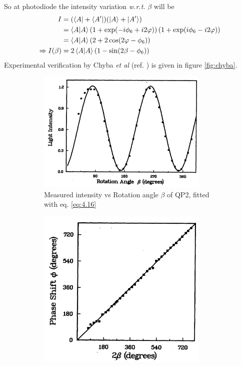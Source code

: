 \documentclass[11pt,a4paper]{article}
\numberwithin{equation}{section}
\begin{document}
So at photodiode the intensity variation \textit{w.r.t.} $\beta$ will be
\begin{align}
	I &= (\bra{A}+\bra{A'})(\ket{A}+\ket{A'}) \nonumber\\
	&= \braket{A}{A} \left(1+\exp(-i\phi_6+i2\varphi)\right)\left(1+\exp(i\phi_6-i2\varphi)\right)\nonumber\\
	&= \braket{A}{A}(2 + 2\cos(2\varphi - \phi_6))\nonumber\\
	\Rightarrow I(\beta)&= 2\braket{A}{A} \left(1- \sin(2\beta - \phi_6)\right) \label{eq:4.16}
\end{align}
Experimental verification by Chyba \textit{et al} (ref. \cite{chyba 88}) is given in figure \ref{fig:chyba}.
\begin{figure}[H]
	\begin{subfigure}[H]{0.53\textwidth}
		\centering
		\includegraphics[width=0.9\textwidth]{chyba 1.png}
		\caption{Measured intensity vs Rotation angle  $\beta$ of QP2, fitted with eq. \ref{eq:4.16} }
		\label{fig:chyba a}
	\end{subfigure}
	\hfil
	\begin{subfigure}[H]{0.41\textwidth}
		\centering
		\includegraphics[width=0.9\textwidth]{chyba 2.png}

\end{subfigure}
\end{figure}
\end{document}
